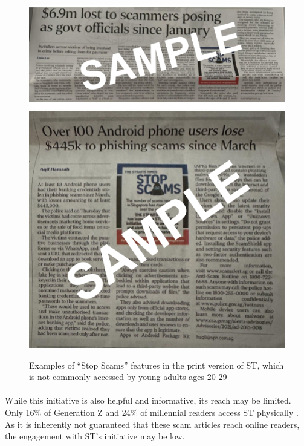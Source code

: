 \documentclass[a4paper]{article}
\begin{document}
\begin{figure}[ht!]
   \centering
  \includegraphics[width=\textwidth]{stopscams1} \endminipage\hfill
   \centering
  \includegraphics[width=\textwidth]{stopscams2} \endminipage{}
  \caption{Examples of “Stop Scams” features in the print version of ST, which
    is not commonly accessed by young adults ages 20-29}\label{fig:stopcams}
\end{figure}

\paragraph{} While this initiative is also helpful and informative, its reach
may be limited. Only 16\% of Generation Z and 24\% of millennial readers access
ST physically \parencite{Ho.2021}. As it is inherently not guaranteed that these
scam articles reach online readers, the engagement with ST’s initiative may be
low.
\end{document}
